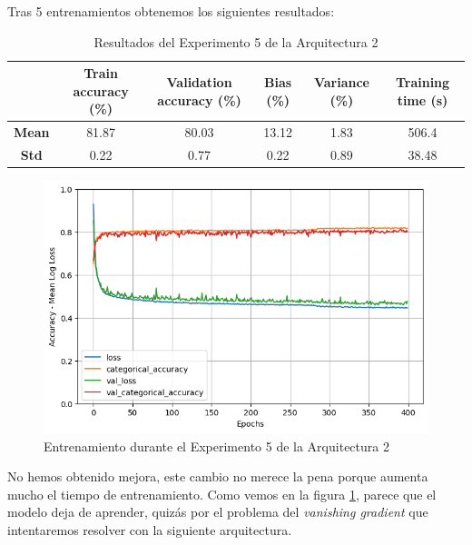 \documentclass{article}
\begin{document}
			Tras 5 entrenamientos obtenemos los siguientes resultados:
			
			\begin{table}[!h]
				\begin{center}
					\begin{tabular}{ c | c | c | c | c | c |}
						\ & \textbf{Train accuracy (\%)} & \textbf{Validation accuracy (\%)} & \textbf{Bias (\%)} & \textbf{Variance (\%)} & \textbf{Training time (s)} \\ \hline
						\textbf{Mean} & 81.87 & 80.03 & 13.12 & 1.83 & 506.4 \\ \hline
						\textbf{Std} & 0.22 & 0.77 & 0.22 & 0.89 & 38.48 \\ \hline
					\end{tabular}
					\caption{Resultados del Experimento 5 de la Arquitectura 2}
					\label{tab:res-a2-e5}
				\end{center}
			\end{table}
			
			\begin{figure}[!h]
				\begin{center}
					\includegraphics[scale=0.5]{tr-a2-e5.png}		
					\caption{Entrenamiento durante el Experimento 5 de la Arquitectura 2}	
					\label{tr-a2-e5}
				\end{center}
			\end{figure}
			
			\newpage
			No hemos obtenido mejora, este cambio no merece la pena porque aumenta mucho el tiempo de entrenamiento. Como vemos en la figura \ref{tr-a2-e5}, parece que el modelo deja de aprender, quiz\'as por el problema del \textit{vanishing gradient} que intentaremos resolver con la siguiente arquitectura.
		
\end{document}
